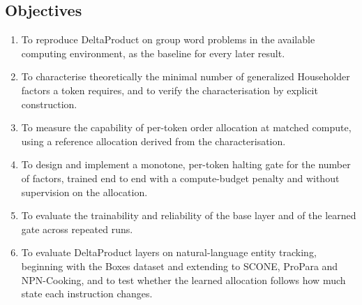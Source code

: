 \subsection{Objectives}
\begin{enumerate}[label={(\arabic*)}]
	\item To reproduce DeltaProduct on group word problems in the available computing environment, as the baseline for every later result.
	\item To characterise theoretically the minimal number of generalized Householder factors a token requires, and to verify the characterisation by explicit construction.
	\item To measure the capability of per-token order allocation at matched compute, using a reference allocation derived from the characterisation.
	\item To design and implement a monotone, per-token halting gate for the number of factors, trained end to end with a compute-budget penalty and without supervision on the allocation.
	\item To evaluate the trainability and reliability of the base layer and of the learned gate across repeated runs.
	\item To evaluate DeltaProduct layers on natural-language entity tracking, beginning with the Boxes dataset \cite{entitytracking} and extending to SCONE, ProPara and NPN-Cooking, and to test whether the learned allocation follows how much state each instruction changes.
\end{enumerate}
